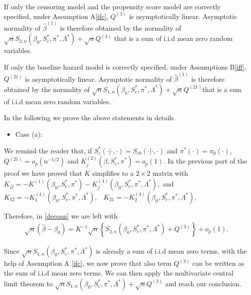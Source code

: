 \documentclass[11pt]{article}
\newcommand{\ee}{\end{eqnarray}}
\newcommand{\be}{\begin{eqnarray}}
\begin{document}
If only the censoring model and the propensity score model are correctly specified, under Assumption A\ref{ifc}, $Q^{(3)}$ is asymptotically linear. Asymptotic normality of $\hat \beta^{(1)}$ is therefore obtained by the normality of $\sqrt{n}S_{2,n}(\beta_0, S^{*}_c,  \pi^{*}, \Lambda^{*})+\sqrt{n}Q^{(3)}$ that is a sum of i.i.d mean zero random variables.

If only the baseline hazard model is correctly specified, under Assumptions B\ref{ifl}, $Q^{(21)}$ is asymptotically linear. Asymptotic normality of $\hat \beta^{(1)}$ is therefore obtained by the normality of $\sqrt{n}{S}_{1,n}(\beta_0, S^{*}_c,  \pi^{*}, \Lambda^{*})+\sqrt{n}Q^{(21)}$that is a sum of i.i.d mean zero random variables.


In the following we prove the above statements in details.

\begin{itemize}
\item{Case (a):}
\end{itemize}
We remind the reader that, if $S_c^{*}(\cdot | \cdot,\cdot)=S_{c0}(\cdot | \cdot,\cdot)$ and $\pi^{*}(\cdot)=\pi_{0}(\cdot)$, $Q^{(21)}=o_p(n^{-1/2})$ and $K^{(2)}_j(\beta, S^{*}_c,\pi^{*})=o_p(1)$. 
In the previous part of the proof we have proved that ${K}$ simplifies to a $2\times2$ matrix with
${K}_{jj}=-K^{(1)}(\beta_0,S^{*}_c,  \pi^{*})-K^{(4)}_j(\beta_0,S^{*}_c,  \pi^{*},\Lambda^{*}),$
and ${K}_{12}=-K^{(4)}_{1}(\beta_0,S^{*}_c,  \pi^{*},\Lambda^{*}),\;\;\;{K}_{21}=-K^{(4)}_2(\beta_0,S^{*}_c,  \pi^{*},\Lambda^{*}).$

Therefore, in \eqref{decoan} we are left with 
\be\label{decoana}
\sqrt{n}(\hat{{\beta}}-{\beta}_{0})={K}^{-1}\sqrt{n}\left\{S_{2,n}(\beta_0, S^{*}_c,  \pi^{*}, \Lambda^{*})+{Q}^{(3)}\right\}+o_p(1).
\ee

Since $\sqrt{n}{S}_{1,n}(\beta_0, S^{*}_c,  \pi^{*}, \Lambda^{*})$ is already a sum of i.i.d mean zero terms, with the help of Assumption A \ref{ifc}, we now prove that also term ${Q}^{(3)}$ can be written as the sum of i.i.d mean zero terms.
We can then apply the multivariate central limit theorem to $\sqrt{n}{S}_{1,n}(\beta_0, S^{*}_c,  \pi^{*}, \Lambda^{*})+\sqrt{n}{Q}^{(3)}$ and reach our conclusion.
\end{document}
